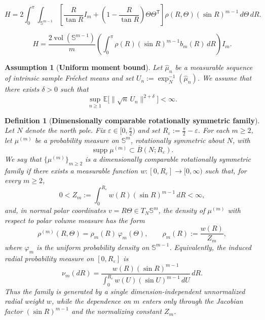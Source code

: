 \documentclass[10pt,a4paper]{amsart}
\newtheorem{definition}{Definition}
\newtheorem{assumption}{Assumption}
\begin{document}
\begin{equation}
\label{eqn:Hessian-general-density}
\boxed{
    H
    =
    2\int_0^\pi\!\!\int_{\mathbb S^{m-1}}
    \left[
    \frac{R}{\tan R}I_m+
    \left(1-\frac{R}{\tan R}\right)\Theta\Theta^{\mathsf T}
    \right]
    \rho(R,\Theta)(\sin R)^{m-1}\,d\Theta\,dR .
}
\end{equation}

\begin{equation}
\label{eqn:Hess}
\boxed{
    H
    =
    \frac{2\operatorname{vol}(\mathbb S^{m-1})}{m}
    \left(\int_0^\pi \rho(R)(\sin R)^{m-1}b_m(R)\,dR\right)I_m .
}
\end{equation}

\begin{assumption}[\textbf{Uniform moment bound}]
\label{assump:momnt-bound}
Let \(\widehat\mu_n\) be a measurable sequence of intrinsic sample Fr\'echet means and set \(U_n:=\exp_N^{-1}(\widehat\mu_n)\).  We assume that there exists \(\delta>0\) such that
\[
    \sup_{n\ge1}\mathbb E\bigl[\|\sqrt n\,U_n\|^{2+\delta}\bigr]<\infty .
\]
\end{assumption}

\begin{definition}[\textbf{Dimensionally comparable rotationally symmetric family}]
\label{def:dimensionally-comparable-distributions}
Let \(N\) denote the north pole.  Fix \(\varepsilon\in[0,\frac{\pi}{2})\) and set \(R_\varepsilon:=\frac{\pi}{2}-\varepsilon\).  For each \(m\ge2\), let \(\mu^{(m)}\) be a probability measure on \(\mathbb S^m\), rotationally symmetric about \(N\), with
\[
\operatorname{supp}\mu^{(m)}\subset \overline B(N;R_\varepsilon).
\]
We say that \(\{\mu^{(m)}\}_{m\ge2}\) is a \emph{dimensionally comparable rotationally symmetric family} if there exists a measurable function \(w:[0,R_\varepsilon]\to[0,\infty)\) such that, for every \(m\ge2\),
\[
0<Z_m:=\int_{0}^{R_\varepsilon} w(R)(\sin R)^{m-1}\,dR<\infty,
\]
and, in normal polar coordinates \(v=R\Theta\in T_N\mathbb S^m\), the density of \(\mu^{(m)}\) with respect to polar volume measure has the form
\[
\rho^{(m)}(R,\Theta)=\rho_m(R)\,\varphi_m(\Theta),
\qquad
\rho_m(R):=\frac{w(R)}{Z_m},
\]
where \(\varphi_m\) is the uniform probability density on \(\mathbb S^{m-1}\).  Equivalently, the induced radial probability measure on \([0,R_\varepsilon]\) is
\[
\nu_m(dR)=\frac{w(R)(\sin R)^{m-1}}{\int_{0}^{R_\varepsilon} w(U)(\sin U)^{m-1}\,dU}\,dR.
\]
Thus the family is generated by a single dimension-independent unnormalized radial weight \(w\), while the dependence on \(m\) enters only through the Jacobian factor \((\sin R)^{m-1}\) and the normalizing constant \(Z_m\).
\end{definition}
\end{document}
